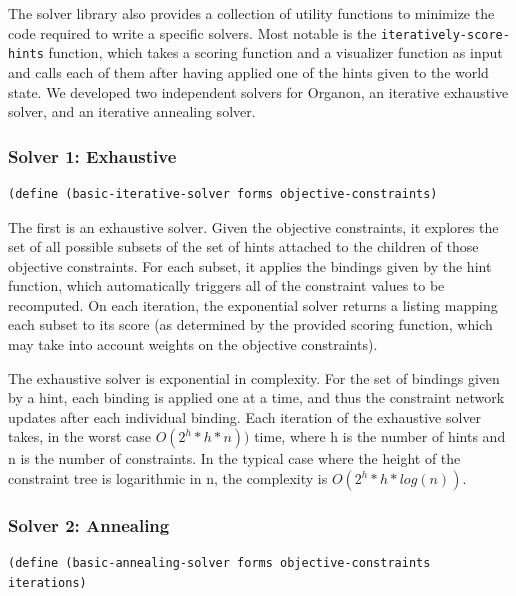 \documentclass[12pt,a4paper]{article}
\begin{document}
The solver library also provides a collection of utility functions to minimize the code required to write a specific solvers. Most notable is the \texttt{iteratively-score-hints} function, which takes a scoring function and a visualizer function as input and calls each of them after having applied one of the hints given to the world state. We developed two independent solvers for Organon, an iterative exhaustive solver, and an iterative annealing solver.

\subsubsection{Solver 1: Exhaustive}
\begin{lstlisting}
(define (basic-iterative-solver forms objective-constraints)
\end{lstlisting}

The first is an exhaustive solver. Given the objective constraints, it explores the set of all possible subsets of the set of hints attached to the children of those objective constraints. For each subset, it applies the bindings given by the hint function, which automatically triggers all of the constraint values to be recomputed. On each iteration, the exponential solver returns a listing mapping each subset to its score (as determined by the provided scoring function, which may take into account weights on the objective constraints).

The exhaustive solver is exponential in complexity. For the set of bindings given by a hint, each binding is applied one at a time, and thus the constraint network updates after each individual binding. Each iteration of the exhaustive solver takes, in the worst case $O(2^{h}*h*n))$ time, where h is the number of hints and n is the number of constraints. In the typical case where the height of the constraint tree is logarithmic in n, the complexity is $O(2^{h}*h*log(n))$.
\newline

\subsubsection{Solver 2: Annealing}
\begin{lstlisting}
(define (basic-annealing-solver forms objective-constraints iterations)
\end{lstlisting}
\end{document}
